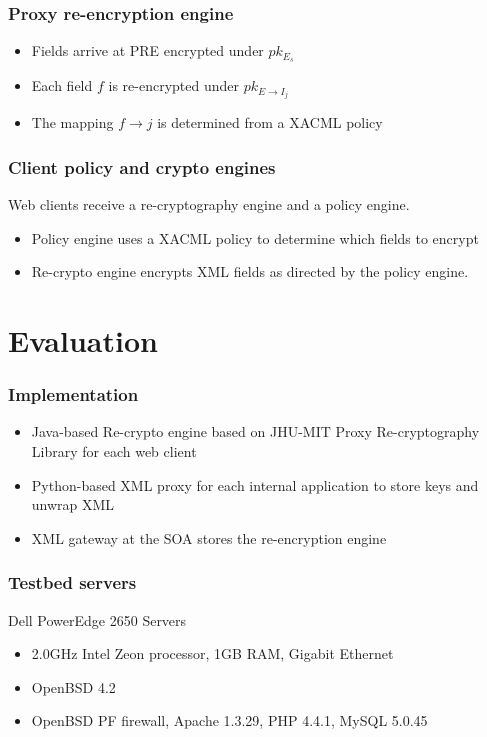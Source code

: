\documentclass{beamer}
\begin{document}
\begin{frame}
\frametitle{Proxy re-encryption engine}
\begin{itemize}
\item Fields arrive at PRE encrypted under $pk_{E_s}$
\item Each field $f$ is re-encrypted under $pk_{E \to I_j}$
\item The mapping $f \to j$ is determined from a XACML policy
\end{itemize}
\end{frame}

\begin{frame}
\frametitle{Client policy and crypto engines}
Web clients receive a re-cryptography engine and a policy engine. 
\medskip
\begin{itemize}
\item \alert{Policy engine} uses a XACML policy to determine which fields to
encrypt
\item \alert{Re-crypto engine} encrypts XML fields as directed by the policy
engine.
\end{itemize}
\end{frame}


\section{Evaluation}
\begin{frame}
\frametitle{Implementation}
\begin{itemize}
\item Java-based Re-crypto engine based on JHU-MIT Proxy Re-cryptography
Library for each web client
\item Python-based XML proxy for each internal application to store keys and
unwrap XML
\item XML gateway at the SOA stores the re-encryption engine 
\end{itemize}
\end{frame}

\begin{frame}
\frametitle{Testbed servers}
Dell PowerEdge 2650 Servers
\begin{itemize}
\item 2.0GHz Intel Zeon processor, 1GB RAM, Gigabit Ethernet
\item OpenBSD 4.2
\item OpenBSD PF firewall, Apache 1.3.29, PHP 4.4.1, MySQL 5.0.45 
\end{itemize}
\end{frame}
\end{document}
